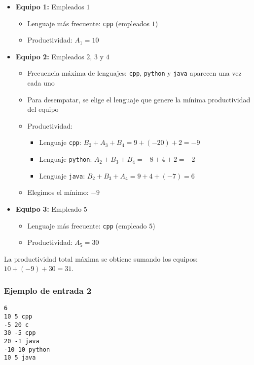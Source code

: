 \begin{itemize}
    \item \textbf{Equipo 1:} Empleados $1$
        \begin{itemize}
            \item Lenguaje más frecuente: \texttt{cpp} (empleados $1$)  
            \item Productividad: $A_1 = 10$
        \end{itemize}
    \item \textbf{Equipo 2:} Empleados $2$, $3$ y $4$
        \begin{itemize}
            \item Frecuencia máxima de lenguajes: \texttt{cpp}, \texttt{python} y \texttt{java} aparecen una vez cada uno  
            \item Para desempatar, se elige el lenguaje que genere la mínima productividad del equipo
            \item Productividad:  
            \begin{itemize}
                \item Lenguaje \texttt{cpp}: $B_2 + A_3 + B_4 = 9 + (-20) + 2 = -9$
                \item Lenguaje \texttt{python}: $A_2 + B_3 + B_4 = -8 + 4 + 2 = -2$
                \item Lenguaje \texttt{java}: $B_2 + B_3 + A_4 = 9 + 4 + (-7) = 6$
            \end{itemize}
            \item Elegimos el mínimo: $-9$
        \end{itemize}
    \item \textbf{Equipo 3:} Empleado $5$
        \begin{itemize}
            \item Lenguaje más frecuente: \texttt{cpp} (empleado $5$)  
            \item Productividad: $A_5 = 30$
        \end{itemize}
\end{itemize}

La productividad total máxima se obtiene sumando los equipos: $10 + (-9) + 30 = 31$.

\newpage

\subsubsection*{Ejemplo de entrada 2}

\begin{verbatim}
6
10 5 cpp
-5 20 c
30 -5 cpp
20 -1 java
-10 10 python
10 5 java
\end{verbatim}

